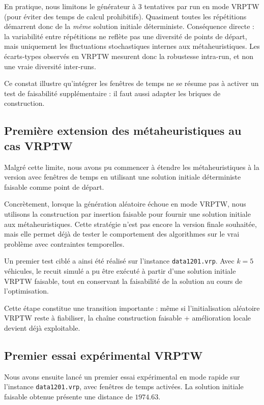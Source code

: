\documentclass[11pt,a4paper]{article}
\newcommand{\og}{%
  \ifmmode\langle\else\guillemotleft\nobreak\fi}
\newcommand{\fg}{%
  \ifmmode\rangle\else\nobreak\guillemotright\fi}
\begin{document}
En pratique, nous limitons le générateur à $3$ tentatives par run en mode VRPTW (pour éviter des temps de calcul prohibitifs). Quasiment toutes les répétitions démarrent donc de la \emph{même} solution initiale déterministe. Conséquence directe : la variabilité entre répétitions ne reflète pas une diversité de points de départ, mais uniquement les fluctuations stochastiques internes aux métaheuristiques. Les écarts-types observés en VRPTW mesurent donc la robustesse intra-run, et non une vraie diversité inter-runs.

Ce constat illustre qu'intégrer les fenêtres de temps ne se résume pas à activer un test de faisabilité supplémentaire : il faut aussi adapter les briques de construction.

\subsection{Première extension des métaheuristiques au cas VRPTW}
Malgré cette limite, nous avons pu commencer à étendre les métaheuristiques à la version avec fenêtres de temps en utilisant une solution initiale déterministe faisable comme point de départ.

Concrètement, lorsque la génération aléatoire échoue en mode VRPTW, nous utilisons la construction par insertion faisable pour fournir une solution initiale aux métaheuristiques. Cette stratégie n'est pas encore la version finale souhaitée, mais elle permet déjà de tester le comportement des algorithmes sur le vrai problème avec contraintes temporelles.

Un premier test ciblé a ainsi été réalisé sur l'instance \texttt{data1201.vrp}. Avec \(k=5\) véhicules, le recuit simulé a pu être exécuté à partir d'une solution initiale VRPTW faisable, tout en conservant la faisabilité de la solution au cours de l'optimisation.

Cette étape constitue une transition importante : même si l'initialisation aléatoire VRPTW reste à fiabiliser, la chaîne \og construction faisable + amélioration locale \fg{} devient déjà exploitable.

\subsection{Premier essai expérimental VRPTW}
Nous avons ensuite lancé un premier essai expérimental en mode rapide sur l'instance \texttt{data1201.vrp}, avec fenêtres de temps activées. La solution initiale faisable obtenue présente une distance de \(1974.63\).
\end{document}
